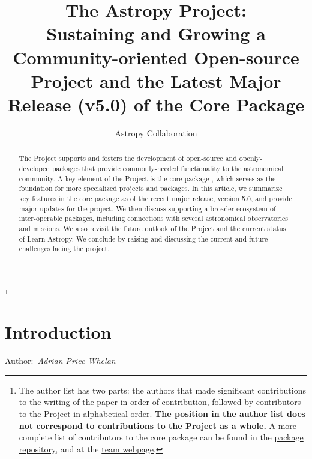 \documentclass[modern]{aastex631}
\newcommand{\secauthor}[1]{{\color{blue}Author:~\textit{#1}}}
\begin{document}
\draft{\today}

\title{The Astropy Project: \\
       Sustaining and Growing a Community-oriented Open-source Project and
       the Latest Major Release (v5.0) of the Core Package}


\author{Astropy Collaboration}
\noaffiliation
{\let\thefootnote\relax\footnote{{The author list has two parts: the authors that made significant contributions to the writing of the paper in order of contribution, followed by contributors to the \astropy Project in alphabetical order. \textbf{The position in the author list does not correspond to contributions to the \astropy Project as a whole.} A more complete list of contributors to the core package can be found in the \href{https://github.com/astropy/astropy/graphs/contributors}{package repository}, and at the \href{http://www.astropy.org/team.html}{\astropy team webpage}.}}}

% 

\begin{abstract}
The \astropy Project supports and fosters the development of open-source and openly-developed
\python packages that provide commonly-needed functionality to the astronomical
community.
A key element of the \astropy Project is the core package \astropypkg, which serves as the
foundation for more specialized projects and packages.
In this article, we summarize key features in the core package as of the recent major
release, version 5.0, and provide major updates for the project.
We then discuss supporting a broader ecosystem of inter-operable packages,
including connections with several astronomical observatories and missions.
We also revisit the future outlook of the \astropy Project and the current
status of Learn Astropy. 
We conclude by raising and discussing the current and future challenges facing the project.
\end{abstract}



\section{Introduction} \label{sec:intro}

\secauthor{Adrian Price-Whelan}
\end{document}

